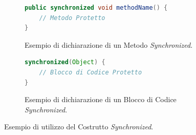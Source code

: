 \begin{figure}[H]
    \centering
    \begin{subfigure}[t]{.45\textwidth}
        \begin{lstlisting}[language=Java]
public synchronized void methodName() {
    // Metodo Protetto
}
        \end{lstlisting}
        \caption{Esempio di dichiarazione di un Metodo \textit{Synchronized}.}
        \label{subfig:SyncronizedMethod}
    \end{subfigure}
    \hfill
    \begin{subfigure}[t]{.45\textwidth}
        \begin{lstlisting}[language=Java]
synchronized(Object) {
    // Blocco di Codice Protetto
}
        \end{lstlisting}
        \caption{Esempio di dichiarazione di un Blocco di Codice \textit{Synchronized}.}
        \label{subfig:SyncronizedBlock}
    \end{subfigure}
    \caption[Esempio di utilizzo del Costrutto \textit{Synchronized}]{Esempio di utilizzo del Costrutto \textit{Synchronized}.}
    \label{fig:SyncronizedBasicExample}
\end{figure}